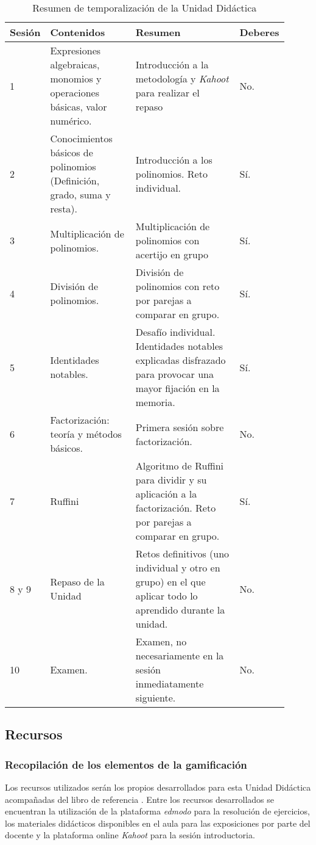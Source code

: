 \begin{longtable}{|m{0.09\linewidth}|m{0.32\linewidth}|m{0.40\linewidth}|m{0.1\linewidth}|}
\caption{Resumen de temporalización de la Unidad Didáctica}
\label{tbl:UD}\\
\hline
\textbf{Sesión} & \textbf{Contenidos} & \textbf{Resumen} & \textbf{Deberes}\\\hline
\endhead
1 & Expresiones algebraicas, monomios y operaciones básicas, valor numérico. & Introducción a la metodología y \textit{Kahoot} para realizar el repaso & No.\\\hline
2 & Conocimientos básicos de polinomios (Definición, grado, suma y resta). & Introducción a los polinomios. Reto individual. & Sí.\\\hline
3 & Multiplicación de polinomios. & Multiplicación de polinomios con acertijo en grupo & Sí. \\\hline
4 & División de polinomios. & División de polinomios con reto por parejas a comparar en grupo. & Sí.\\\hline
5 & Identidades notables. & Desafío individual. Identidades notables explicadas disfrazado para provocar una mayor fijación en la memoria. & Sí. \\\hline
6 & Factorización: teoría y métodos básicos. & Primera sesión sobre factorización. & No.\\\hline
7 & Ruffini & Algoritmo de Ruffini para dividir y su aplicación a la factorización. Reto por parejas a comparar en grupo.& Sí.\\\hline
8 y 9& Repaso de la Unidad & Retos definitivos (uno individual y otro en grupo) en el que aplicar todo lo aprendido durante la unidad. & No. \\\hline
10 & Examen. & Examen, no necesariamente en la sesión inmediatamente siguiente. & No.\\\hline
\end{longtable}



\subsection{Recursos}

\subsubsection{Recopilación de los elementos de la gamificación }

Los recursos utilizados serán los propios desarrollados para esta Unidad Didáctica acompañadas del libro de referencia \cite{MareaVerde}.
%
Entre los recursos desarrollados se encuentran la utilización de la plataforma \textit{edmodo} para la resolución de ejercicios, los materiales didácticos disponibles en el aula para las exposiciones por parte del docente y la plataforma online \textit{Kahoot} para la sesión introductoria.

